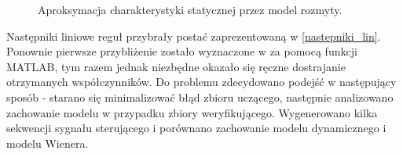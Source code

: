 \documentclass[a4paper,titlepage,11pt,floatssmall]{mwrep}
\begin{document}
\begin{figure}[h!]
\centering
{}
\hfill
{}
\caption{Aproksymacja charakterystyki statycznej przez model rozmyty.}
\end{figure}

Następniki liniowe reguł przybrały postać zaprezentowaną w \ref{nastepniki_lin}. Ponownie pierwsze przybliżenie zostało wyznaczone w za pomocą funkcji MATLAB, tym razem jednak niezbędne okazało się ręczne dostrajanie otrzymanych współczynników. Do problemu zdecydowano podejść w następujący sposób - starano się minimalizować błąd zbioru uczącego, następnie analizowano zachowanie modelu w przypadku zbiory weryfikującego. Wygenerowano kilka sekwencji sygnału sterującego i porównano zachowanie modelu dynamicznego i modelu Wienera.

\newpage
\end{document}
